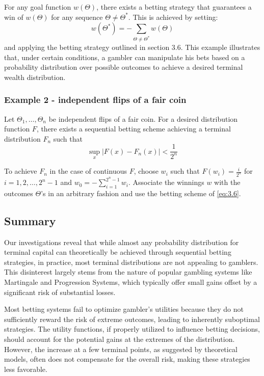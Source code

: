 \documentclass[11pt]{article}
\numberwithin{equation}{section}
\theoremstyle{boldStyle}
\begin{document}
For any goal function \(w(\Theta)\), there exists a betting strategy that guarantees a win of \(w(\Theta)\) 
for any sequence \(\Theta \neq \Theta^*\). This is achieved by setting:
\[
w(\Theta^*) = -\sum_{\Theta \neq \Theta^*} w(\Theta)
\]
and applying the betting strategy outlined in section \(3.6\).
This example illustrates that, under certain conditions, a gambler can manipulate his bets based on a probability distribution over possible outcomes 
to achieve a desired terminal wealth distribution. 

\subsubsection{Example 2 - independent flips of a fair coin}


Let \(\Theta_1, \ldots, \Theta_n\) be independent flips of a fair coin. 
For a desired distribution function \( F \), there exists a sequential betting scheme achieving a terminal distribution \( F_n \) such that 
\[
\sup_x |F(x) - F_n(x)| < \frac{1}{2^n}
\]

To achieve $F_n$ in the case of continuous $F$, choose $w_i$ such that $F(w_i) = \frac{i}{2^n}$ for $i = 1, 2, \ldots, 2^n - 1$ and $w_0 = -\sum_{i=1}^{2^n - 1} w_i$.
Associate the winnings $w$ with the outcomes $\Theta$'s in an arbitrary fashion and use the betting scheme of \ref{eq:3.6}.


\subsection{Summary}

Our investigations reveal that while almost any probability distribution for terminal capital can theoretically be achieved through sequential 
betting strategies, in practice, most terminal distributions are not appealing to gamblers. 
This disinterest largely stems from the nature of popular gambling systems like Martingale and Progression Systems, 
which typically offer small gains offset by a significant risk of substantial losses.

Most betting systems fail to optimize gambler's utilities because they do not sufficiently reward the risk of extreme outcomes, 
leading to inherently suboptimal strategies. The utility functions, if properly utilized to influence betting decisions, 
should account for the potential gains at the extremes of the distribution. However, the increase at a few terminal points, 
as suggested by theoretical models, often does not compensate for the overall risk, making these strategies less favorable.
\end{document}
